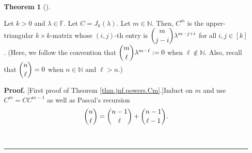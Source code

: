 \documentclass[numbers=enddot,12pt,final,onecolumn,notitlepage]{scrartcl}%
\numberwithin{exer}{subsection}
\theoremstyle{definition}
\newtheorem{theo}{Theorem}[subsection]
\newenvironment{theorem}[1][]
{\begin{theo}[#1]\begin{leftbar}}
{\end{leftbar}\end{theo}}
\newenvironment{proof}[1][Proof]{\noindent\textbf{#1.} }{\ \rule{0.5em}{0.5em}}
\begin{document}
\begin{theorem}
\label{thm.jnf.powers.Cm}Let $k>0$ and $\lambda\in\mathbb{F}$. Let
$C=J_{k}\left(  \lambda\right)  $. Let $m\in\mathbb{N}$. Then, $C^{m}$ is the
upper-triangular $k\times k$-matrix whose $\left(  i,j\right)  $-th entry is
$\dbinom{m}{j-i}\lambda^{m-j+i}$ for all $i,j\in\left[  k\right]  $. (Here, we
follow the convention that $\dbinom{m}{\ell}\lambda^{m-\ell}:=0$ when
$\ell\notin\mathbb{N}$. Also, recall that $\dbinom{n}{\ell}=0$ when
$n\in\mathbb{N}$ and $\ell>n$.)
\end{theorem}

\begin{proof}
[First proof of Theorem \ref{thm.jnf.powers.Cm}.]Induct on $m$ and use
$C^{m}=CC^{m-1}$ as well as Pascal's recursion%
\[
\dbinom{n}{\ell}=\dbinom{n-1}{\ell}+\dbinom{n-1}{\ell-1}.
\]

\end{proof}
\end{document}
